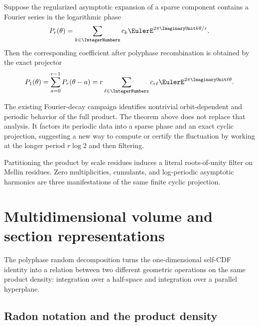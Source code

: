 \documentclass[11pt]{article}
\theoremstyle{definition}
\theoremstyle{remark}
\begin{document}
\begin{corollary}
\label{p5:cor:periodic-filter}
Suppose the regularized asymptotic expansion of a sparse component contains a
Fourier series in the logarithmic phase
\begin{equation}
 P_r(\theta)=\sum_{k\in\IntegerNumbers}c_k\EulerE^{2\pi\ImaginaryUnit k\theta/r}.        \label{p5:eq:Pr-phase}
\end{equation}
Then the corresponding coefficient after polyphase recombination is obtained
by the exact projector
\begin{equation}
 P_1(\theta)=\sum_{a=0}^{r-1}P_r(\theta-a)
 =r\sum_{\ell\in\IntegerNumbers}c_{r\ell}\EulerE^{2\pi\ImaginaryUnit\ell\theta}.       \label{p5:eq:phase-projector}
\end{equation}
\end{corollary}

\begin{remark}
The existing Fourier-decay campaign identifies nontrivial orbit-dependent and
periodic behavior of the full product.  The theorem above does not replace that
analysis.  It factors its periodic data into a sparse phase and an exact cyclic
projection, suggesting a new way to compute or certify the fluctuation by
working at the longer period $r\log2$ and then filtering.
\end{remark}

\begin{resultboxPartiv}
Partitioning the product by scale residues induces a literal roots-of-unity
filter on Mellin residues.  Zero multiplicities, cumulants, and log-periodic
asymptotic harmonics are three manifestations of the same finite cyclic
projection.
\end{resultboxPartiv}

\section{Multidimensional volume and section representations}
\label{p5:sec:sections}

The polyphase random decomposition turns the one-dimensional self-CDF identity
into a relation between two different geometric operations on the same product
density: integration over a half-space and integration over a parallel
hyperplane.

\subsection{Radon notation and the product density}
\end{document}

